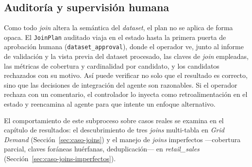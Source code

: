 \subsection{Auditoría y supervisión humana}
\label{sec:join-auditoria}

Como todo \textit{join} altera la semántica del \textit{dataset}, el plan no se aplica de
forma opaca. El \texttt{JoinPlan} auditado viaja en el estado hasta la primera puerta de
aprobación humana (\texttt{dataset\_approval}), donde el operador ve, junto al informe de
validación y la vista previa del dataset procesado, las claves de \textit{join}
empleadas, las métricas de cobertura y cardinalidad por candidato, y los candidatos
rechazados con su motivo. Así puede verificar no solo que el resultado es correcto, sino
que las decisiones de integración del agente son razonables. Si el operador rechaza con un
comentario, el controlador lo inyecta como retroalimentación en el estado y reencamina al
agente para que intente un enfoque alternativo.

El comportamiento de este subproceso sobre casos reales se examina en el capítulo de
resultados: el descubrimiento de tres \textit{joins} multi-tabla en \textit{Grid Demand}
(Sección~\ref{sec:caso-joins}) y el manejo de \textit{joins} imperfectos —cobertura
parcial, claves foráneas huérfanas, deduplicación— en \textit{retail\_sales}
(Sección~\ref{sec:caso-joins-imperfectos}).
